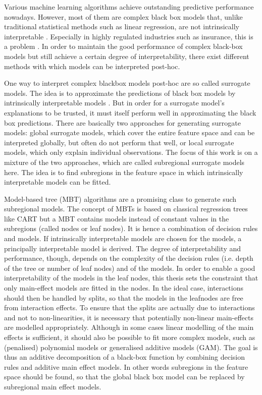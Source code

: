 Various machine learning algorithms achieve outstanding predictive performance nowadays. However, most of them are complex black box models that, unlike traditional statistical methods such as linear regression, are not intrinsically interpretable \citep{Hu.2020}.
Especially in highly regulated industries such as insurance, this is a problem \citep{Henckaerts.2022}.
In order to maintain the good performance of complex black-box models but still achieve a certain degree of interpretability, there exist different methods with which models can be interpreted post-hoc. 


One way to interpret complex blackbox models post-hoc are so called surrogate models. The idea is to approximate the predictions of black box models by intrinsically interpretable models \citep{Molnar.2019}.
But in order for a surrogate model's explanations to be trusted, it must itself perform well in approximating the black box predictions.
There are basically two approaches for generating surrogate models: global surrogate models, which cover the entire feature space and can be interpreted globally, but often do not perform that well, or local surrogate models, which only explain individual observations.  The focus of this work is on a mixture of the two approaches, which are called subregional surrogate models here. 
The idea is to find subregions in the feature space in which intrinsically interpretable models can be fitted.


Model-based tree (MBT) algorithms are a promising class to generate such subregional models. 
The concept of MBTs is based on classical regression trees like CART \citep{Breiman.1984} but a MBT contains models instead of constant values in the subregions (called nodes or leaf nodes).
It is hence a combination of decision rules and models. If intrinsically interpretable models are chosen for the models, a principally interpretable model is derived. The degree of interpretability and performance, though, depends on the complexity of the decision rules (i.e. depth of the tree or number of leaf nodes) and of the models.
In order to enable a good interpretability of the models in the leaf nodes, this thesis sets the constraint that only main-effect models are fitted in the nodes. 
In the ideal case, interactions should then be handled by  splits, so that the models in the leafnodes are free from interaction effects.
To ensure that the splits are actually due to interactions and not to non-linearities, it is necessary that potentially non-linear main-effects are modelled appropriately.
Although in some cases linear modelling of the main effects is sufficient, it should also be possible to fit more complex models, such as (penalised) polynomial models or generalised additive models (GAM).
The goal is thus an additive decomposition of a black-box function by combining decision rules and additive main effect models.  In other words
subregions in the feature space should be found, so that the global black box model can be replaced by subregional main effect models.


